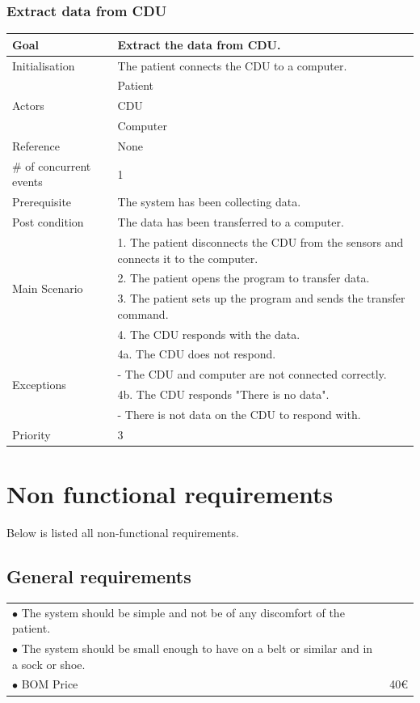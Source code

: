 \subsubsection{Extract data from CDU}
\begin{table}[H]
	\centering
	\begin{tabular}{|l|p{10cm}|}
	\hline
	Goal 							& Extract the data from CDU.\\ \hline
	Initialisation 					& The patient connects the CDU to a computer. \\ \hline
	\multirow{3}{*}{Actors} 		& Patient \\ 
									& CDU \\
									& Computer \\\hline
	Reference 						& None \\ \hline
	\# of concurrent events 		& 1 \\ \hline
	Prerequisite  					& The system has been collecting data.\\ \hline
	Post condition 					& The data has been transferred to a computer. \\ \hline
	\multirow{4}{*}{Main Scenario} 	& 1. The patient disconnects the CDU from the sensors and connects it to the computer. \\
									& 2. The patient opens the program to transfer data.\\
									& 3. The patient sets up the program and sends the transfer command.\\ 
									& 4. The CDU responds with the data. \\ \hline
	\multirow{4}{*}{Exceptions} & 4a. The CDU does not respond. \\ 
								& - The CDU and computer are not connected correctly.\\											& 4b. The CDU responds "There is no data". \\
								& - There is not data on the CDU to respond with.\\\hline
	Priority					& 3\\\hline
	\end{tabular}
\end{table}

\section{Non functional requirements}
Below is listed all non-functional requirements. \\

\subsection{General requirements}
\begin{table}[H]
\begin{tabular}{p{10cm} p{2cm}}
$\bullet$ The system should be simple and not be of any discomfort of the patient. & \\
$\bullet$ The system should be small enough to have on a belt or similar and in a sock or shoe. &\\
$\bullet$ BOM Price & 40€\\
\end{tabular}
\end{table}


